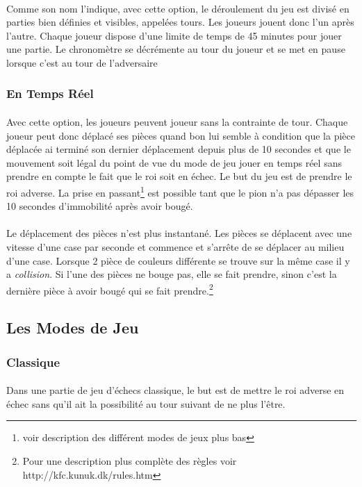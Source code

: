 \documentclass[10pt, a4paper]{article}
\begin{document}
					\paragraph{}Comme son nom l'indique, avec cette option, le déroulement du jeu est divisé en parties bien définies et visibles, appelées tours. Les joueurs jouent donc l'un après l'autre. Chaque joueur dispose d'une limite de temps de 45 minutes pour jouer une partie. Le chronomètre se décrémente au tour du joueur et se met en pause lorsque c'est au tour de l'adversaire		
				\subsubsection{En Temps Réel}
					\paragraph{}Avec cette option, les joueurs peuvent joueur sans la contrainte de tour. Chaque joueur peut donc déplacé ses pièces quand bon lui semble à condition que la pièce déplacée ai terminé son dernier déplacement depuis plus de 10 secondes et que le mouvement soit légal du point de vue du mode de jeu jouer en temps réel sans prendre en compte le fait que le roi soit en échec. Le but du jeu est de prendre le roi adverse. La prise en passant\footnote{voir description des différent modes de jeux plus bas} est possible tant que le pion n'a pas dépasser les 10 secondes d'immobilité après avoir bougé.
					\paragraph{}Le déplacement des pièces n'est plus instantané. Les pièces se déplacent avec une vitesse d'une case par seconde et commence et s'arrête de se déplacer au milieu d'une case. Lorsque 2 pièce de couleurs différente se trouve sur la même case il y a \textit{collision}. Si l'une des pièces ne bouge pas, elle se fait prendre, sinon c'est la dernière pièce à avoir bougé qui se fait prendre.\footnote{Pour une description plus complète des règles voir http://kfc.kunuk.dk/rules.htm}
			\subsection{Les Modes de Jeu}				
				\subsubsection{Classique}
					\paragraph{}Dans une partie de jeu d'échecs classique, le but est de mettre le roi adverse en échec sans qu'il ait la possibilité au tour suivant de ne plus l'être.
\end{document}
